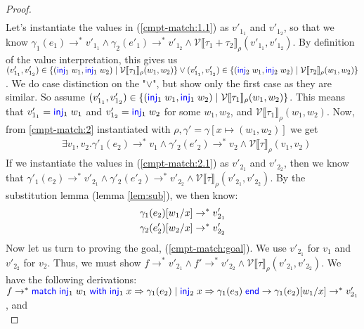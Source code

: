 \documentclass[twoside,11pt,openright]{report}
\theoremstyle{definition}
\newcommand{\Keyword}[1]{{\color{blue} \mathsf{#1}}}
\newcommand{\var}{x}
\newcommand{\expr}{e}
\newcommand{\val}{v}
\newcommand{\valB}{w}
\newcommand{\Inj}[1]{\Keyword{inj}_{#1}\;}
\newcommand{\MatchCmd}{\Keyword{match}}
\newcommand{\WithCmd}{\Keyword{with}}
\newcommand{\EndCmd}{\Keyword{end}}
\def\Match#1with#2=>#3|#4=>#5end{\MatchCmd{}\;#1\;\WithCmd{}\;#2\Rightarrow#3 \;|\;#4\Rightarrow#5\;\EndCmd{}}
\newcommand{\subst}[3]{#1{\left[#3 \middle/ #2 \right]}}
\newcommand{\Tsum}[2]{#1 + #2}
\newcommand{\typ}{\tau}
\newcommand{\step}{\rightarrow}
\newcommand{\stepS}{\rightarrow^*}
\newcommand{\ValInp}[2]{\mathcal{V} \llbracket #1 \rrbracket_{#2}}
\newcommand{\map}[2]{#1 \mapsto #2}
\begin{document}
\begin{proof}
\begin{align}
  \end{align}
  Let's instantiate the values in (\ref*{cmpt-match:1.1}) as $\val'_{1_1}$ and $\val'_{1_2}$, so that we know $\gamma_1(\expr_1) \stepS \val'_{1_1} \land \gamma_2(\expr'_1) \stepS \val'_{1_2} \land \ValInp{\Tsum{\typ_1}{\typ_2}}{\rho}(\val'_{1_1}, \val'_{1_2})$. By definition of the value interpretation, this gives us\\
  $(\val'_{1_1}, \val'_{1_2}) \in \{(\Inj{1} \valB_1, \Inj{1} \valB_2) \mid \ValInp{\typ_1}{\rho}(\valB_1, \valB_2)\} \lor
  (\val'_{1_1}, \val'_{1_2}) \in \{(\Inj{2} \valB_1, \Inj{2} \valB_2) \mid \ValInp{\typ_2}{\rho}(\valB_1, \valB_2)\}$. We do case distinction on the "$\lor$", but show only the first case as they are similar. So assume 
  $(\val'_{1_1}, \val'_{1_2}) \in \{(\Inj{1} \valB_1, \Inj{1} \valB_2) \mid \ValInp{\typ_1}{\rho}(\valB_1, \valB_2)\}$. This means that $\val'_{1_1} = \Inj{1} \valB_1$ and $\val'_{1_2} = \Inj{1} \valB_2$ for some $\valB_1, \valB_2$, and $\ValInp{\typ_1}{\rho}(\valB_1, \valB_2)$.
  Now, from \ref{cmpt-match:2} instantiated with $\rho, \gamma' = \gamma[\map{\var}{(\valB_1, \valB_2)}]$ we get
  \begin{align}
    &\exists \val_1, \val_2 . \gamma'_1(\expr_2) \stepS \val_1 \land \gamma'_2(\expr'_2) \stepS \val_2 \land \ValInp{\typ}{\rho}(\val_1, \val_2)\label{cmpt-match:2.1}
  \end{align}
  If we instantiate the values in (\ref*{cmpt-match:2.1}) as $\val'_{2_1}$ and $\val'_{2_2}$, then we know that $\gamma'_1(\expr_2) \stepS \val'_{2_1} \land \gamma'_2(\expr'_2) \stepS \val'_{2_2} \land \ValInp{\typ}{\rho}(\val'_{2_1}, \val'_{2_2})$. By the substitution lemma (lemma \ref{lem:sub}), we then know:
  \begin{align}
    &\subst{\gamma_1(\expr_2)}{\var}{\valB_1} \stepS \val'_{2_1}\label{cmpt-match:sub.1}\\
    &\subst{\gamma_2(\expr'_2)}{\var}{\valB_2} \stepS \val'_{2_2}\label{cmpt-match:sub.2}
  \end{align}
  Now let us turn to proving the goal, (\ref*{cmpt-match:goal}). We use $\val'_{2_1}$ for $\val_1$ and $\val'_{2_2}$ for $\val_2$. Thus, we must show 
  $f \stepS \val'_{2_1} \land f' \stepS \val'_{2_2} \land \ValInp{\typ}{\rho}(\val'_{2_1}, \val'_{2_2})$. We have the following derivations:\\
  $f \stepS \Match \Inj{1} \valB_1 with \Inj{1} \var => \gamma_1(\expr_2) | \Inj{2} \var => \gamma_1(\expr_3) end \step \subst{\gamma_1(\expr_2)}{\var}{\valB_1} \stepS \val'_{2_1}$, and\\

\end{proof}
\end{document}
